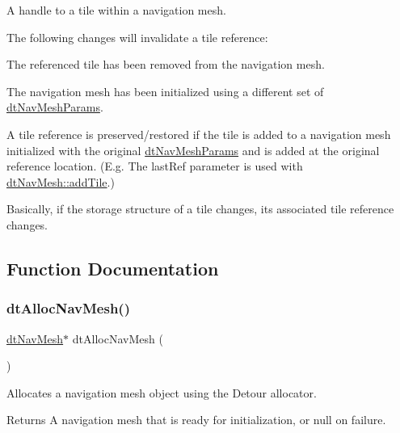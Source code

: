 A handle to a tile within a navigation mesh.

\begin{DoxyParagraph}{}

\end{DoxyParagraph}
The following changes will invalidate a tile reference\+:


\begin{DoxyItemize}
\item The referenced tile has been removed from the navigation mesh.
\item The navigation mesh has been initialized using a different set of \hyperlink{structdtNavMeshParams}{dt\+Nav\+Mesh\+Params}.
\end{DoxyItemize}

A tile reference is preserved/restored if the tile is added to a navigation mesh initialized with the original \hyperlink{structdtNavMeshParams}{dt\+Nav\+Mesh\+Params} and is added at the original reference location. (E.\+g. The last\+Ref parameter is used with \hyperlink{classdtNavMesh_a5b5a7c4fa72c08d9a6d4cc4d8cd3bb89}{dt\+Nav\+Mesh\+::add\+Tile}.)

Basically, if the storage structure of a tile changes, its associated tile reference changes. 

\subsection{Function Documentation}
\mbox{\label{group__detour_ga73648d53c5a414855a2aa264aab9263c}} 
\subsubsection{\texorpdfstring{dt\+Alloc\+Nav\+Mesh()}{dtAllocNavMesh()}}
{\footnotesize\ttfamily \hyperlink{classdtNavMesh}{dt\+Nav\+Mesh}$\ast$ dt\+Alloc\+Nav\+Mesh (\begin{DoxyParamCaption}{ }\end{DoxyParamCaption})}

Allocates a navigation mesh object using the Detour allocator. \begin{DoxyReturn}{Returns}
A navigation mesh that is ready for initialization, or null on failure. 
\end{DoxyReturn}
\mbox{\label{group__detour_gae547f165feefc955136130c8e22f207a}} 
